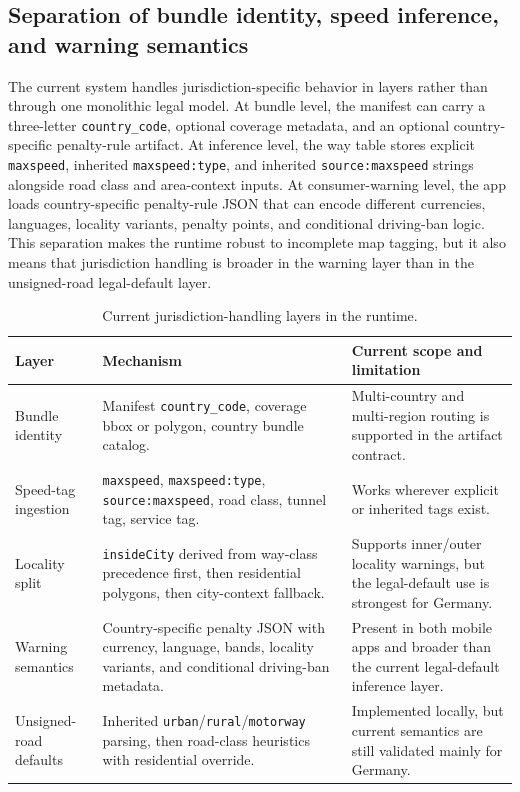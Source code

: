 \documentclass{article}
\begin{document}
\subsection{Separation of bundle identity, speed inference, and warning semantics}
The current system handles jurisdiction-specific behavior in layers rather than through one monolithic legal model. At bundle level, the manifest can carry a three-letter \texttt{country\_code}, optional coverage metadata, and an optional country-specific penalty-rule artifact. At inference level, the way table stores explicit \texttt{maxspeed}, inherited \texttt{maxspeed:type}, and inherited \texttt{source:maxspeed} strings alongside road class and area-context inputs. At consumer-warning level, the app loads country-specific penalty-rule JSON that can encode different currencies, languages, locality variants, penalty points, and conditional driving-ban logic. This separation makes the runtime robust to incomplete map tagging, but it also means that jurisdiction handling is broader in the warning layer than in the unsigned-road legal-default layer.

\begin{table}[!htbp]
\centering
\scriptsize
\caption{Current jurisdiction-handling layers in the runtime.}
\label{tab:jurisdiction_layers}
\begin{tabular}{p{2.8cm}p{5.0cm}p{3.7cm}}
\toprule
Layer & Mechanism & Current scope and limitation \\
\midrule
Bundle identity & Manifest \texttt{country\_code}, coverage bbox or polygon, country bundle catalog. & Multi-country and multi-region routing is supported in the artifact contract. \\
Speed-tag ingestion & \texttt{maxspeed}, \texttt{maxspeed:type}, \texttt{source:maxspeed}, road class, tunnel tag, service tag. & Works wherever explicit or inherited tags exist. \\
Locality split & \texttt{insideCity} derived from way-class precedence first, then residential polygons, then city-context fallback. & Supports inner/outer locality warnings, but the legal-default use is strongest for Germany. \\
Warning semantics & Country-specific penalty JSON with currency, language, bands, locality variants, and conditional driving-ban metadata. & Present in both mobile apps and broader than the current legal-default inference layer. \\
Unsigned-road defaults & Inherited \texttt{urban}/\texttt{rural}/\texttt{motorway} parsing, then road-class heuristics with residential override. & Implemented locally, but current semantics are still validated mainly for Germany. \\
\bottomrule
\end{tabular}
\end{table}
\end{document}
